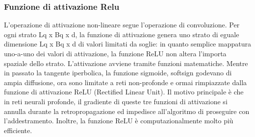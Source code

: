 \documentclass[14pt]{extarticle}
\begin{document}

\subsubsection{Funzione di attivazione Relu}
L’operazione di attivazione non-lineare segue l’operazione di convoluzione. Per ogni
strato Lq x Bq x d, la funzione di attivazione genera uno strato di eguale dimensione
Lq x Bq x d di valori limitati da soglie: in quanto semplice mappatura uno-a-uno dei
valori di attivazione, la funzione ReLU non altera l’importa spaziale dello strato.
L’attivazione avviene tramite funzioni matematiche. Mentre in passato la tangente iperbolica, la funzione sigmoide, softsign godevano di ampia diffusione, ora sono
limitate a reti non-profonde e ormai rimpiazzate dalla funzione di attivazione ReLU
(Rectified Linear Unit). Il motivo principale è che in reti neurali profonde, il gradiente
di queste tre funzioni di attivazione si annulla durante la retropropagazione ed impedisce all’algoritmo di proseguire con l’addestramento. Inoltre, la funzione ReLU è
computazionalmente molto più efficiente.

\end{document}
